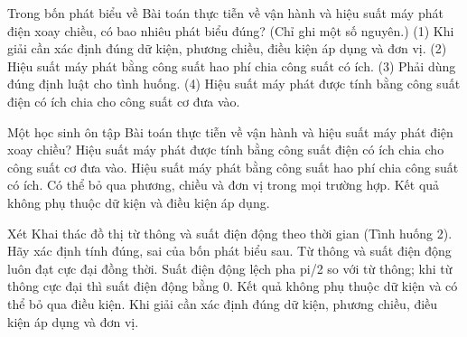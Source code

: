 \begin{ex}
Trong bốn phát biểu về Bài toán thực tiễn về vận hành và hiệu suất máy phát điện xoay chiều, có bao nhiêu phát biểu đúng? (Chỉ ghi một số nguyên.) (1) Khi giải cần xác định đúng dữ kiện, phương chiều, điều kiện áp dụng và đơn vị. (2) Hiệu suất máy phát bằng công suất hao phí chia công suất có ích. (3) Phải dùng đúng định luật cho tình huống. (4) Hiệu suất máy phát được tính bằng công suất điện có ích chia cho công suất cơ đưa vào.
\end{ex}

\begin{ex}
Một học sinh ôn tập Bài toán thực tiễn về vận hành và hiệu suất máy phát điện xoay chiều?
\choice
{\True Hiệu suất máy phát được tính bằng công suất điện có ích chia cho công suất cơ đưa vào.}
{Hiệu suất máy phát bằng công suất hao phí chia công suất có ích.}
{Có thể bỏ qua phương, chiều và đơn vị trong mọi trường hợp.}
{Kết quả không phụ thuộc dữ kiện và điều kiện áp dụng.}
\end{ex}

\begin{ex}
Xét Khai thác đồ thị từ thông và suất điện động theo thời gian (Tình huống 2). Hãy xác định tính đúng, sai của bốn phát biểu sau.
\choiceTF
{Từ thông và suất điện động luôn đạt cực đại đồng thời.}
{\True Suất điện động lệch pha pi/2 so với từ thông; khi từ thông cực đại thì suất điện động bằng 0.}
{Kết quả không phụ thuộc dữ kiện và có thể bỏ qua điều kiện.}
{\True Khi giải cần xác định đúng dữ kiện, phương chiều, điều kiện áp dụng và đơn vị.}
\end{ex}

